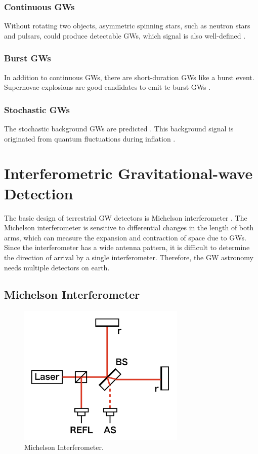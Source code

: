 \subsubsection{Continuous GWs}
Without rotating two objects, asymmetric spinning stars, such as neutron stars and pulsars, could produce detectable GWs, which signal is also well-defined \cite{leaci2012searching,hereld1984search}.

\subsubsection{Burst GWs}
In addition to continuous GWs, there are short-duration GWs like a burst event. Supernovae explosions are good candidates to emit te burst GWs \cite{ott2004gravitational}.

\subsubsection{Stochastic GWs}
The stochastic background GWs are predicted \cite{starobinskii1979spectrum, Christensen_2018}. This background signal is originated from quantum fluctuations during inflation \cite{PhysRevD.23.347}. 

\section{Interferometric Gravitational-wave Detection} \label{sec:12}
The basic design of terrestrial GW detectors is Michelson interferometer \cite{weiss1972electronically}. The Michelson interferometer is sensitive to differential changes in the length of both arms, which can measure the expansion and contraction of space due to GWs. Since the interferometer has a wide antenna pattern, it is difficult to determine the direction of arrival by a single interferometer. Therefore, the GW astronomy needs multiple detectors on earth.

\subsection{Michelson Interferometer} \label{sec:121}
\begin{figure}[h]
  \begin{center}   
    \includegraphics[width=8.0cm]{./img_chap1/img132.png}
    \caption{Michelson Interferometer. }\label{img:img132}
  \end{center}
\end{figure}

